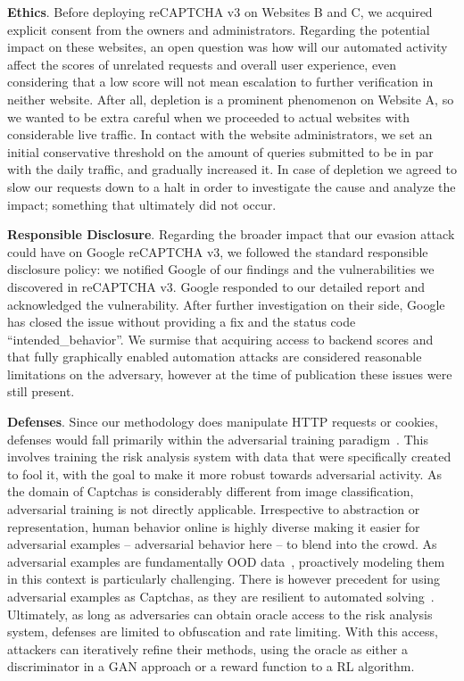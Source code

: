 \textbf{Ethics}.
Before deploying reCAPTCHA v3 on Websites B and C, we acquired explicit consent from the owners and administrators.
Regarding the potential impact on these websites, an open question was how will our automated activity affect the scores of unrelated requests and overall user experience, even considering that a low score will not mean escalation to further verification in neither website.
After all, depletion is a prominent phenomenon on Website A, so we wanted to be extra careful when we proceeded to actual websites with considerable live traffic.
In contact with the website administrators, we set an initial conservative threshold on the amount of queries submitted to be in par with the daily traffic, and gradually increased it.
In case of depletion we agreed to slow our requests down to a halt in order to investigate the cause and analyze the impact; something that ultimately did not occur.

\textbf{Responsible Disclosure}.
Regarding the broader impact that our evasion attack could have on Google reCAPTCHA v3, we followed the standard responsible disclosure policy: we notified Google of our findings and the vulnerabilities we discovered in reCAPTCHA v3.
Google responded to our detailed report and acknowledged the vulnerability.
After further investigation on their side, Google has closed the issue without providing a fix and the status code ``intended\_behavior''.
We surmise that acquiring access to backend scores and that fully graphically enabled automation attacks are considered reasonable limitations on the adversary, however at the time of publication these issues were still present.

\textbf{Defenses}. Since our methodology does manipulate HTTP requests or cookies, defenses would fall primarily within the adversarial training paradigm~\cite{tramer2017ensemble}.
This involves training the risk analysis system with data that were specifically created to fool it, with the goal to make it more robust towards adversarial activity.
As the domain of Captchas is considerably different from image classification, adversarial training is not directly applicable.
Irrespective to abstraction or representation, human behavior online is highly diverse making it easier for adversarial examples -- adversarial behavior here -- to blend into the crowd.
As adversarial examples are fundamentally \gls{OOD} data~\cite{geirhos2020shortcut}, proactively modeling them in this context is particularly challenging.
There is however precedent for using adversarial examples as Captchas, as they are resilient to automated solving~\cite{osadchy2017no}.
Ultimately, as long as adversaries can obtain oracle access to the risk analysis system, defenses are limited to obfuscation and rate limiting.
With this access, attackers can iteratively refine their methods, using the oracle as either a discriminator in a \gls{GAN} approach or a reward function to a \gls{RL} algorithm.

